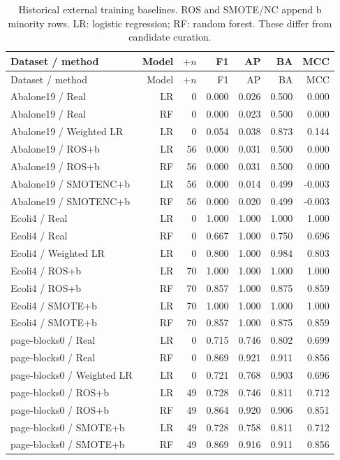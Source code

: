 \begin{longtable}{lrrrrrr}
\caption{Historical external training baselines. ROS and SMOTE/NC append b minority rows. LR: logistic regression; RF: random forest. These differ from candidate curation.}\label{tab:external}\\
\toprule
Dataset / method & Model & $+n$ & F1 & AP & BA & MCC \\
\midrule\endfirsthead
\toprule
Dataset / method & Model & $+n$ & F1 & AP & BA & MCC \\
\midrule\endhead
Abalone19 / Real & LR & 0 & 0.000 & 0.026 & 0.500 & 0.000 \\
Abalone19 / Real & RF & 0 & 0.000 & 0.023 & 0.500 & 0.000 \\
Abalone19 / Weighted LR & LR & 0 & 0.054 & 0.038 & 0.873 & 0.144 \\
Abalone19 / ROS+b & LR & 56 & 0.000 & 0.031 & 0.500 & 0.000 \\
Abalone19 / ROS+b & RF & 56 & 0.000 & 0.031 & 0.500 & 0.000 \\
Abalone19 / SMOTENC+b & LR & 56 & 0.000 & 0.014 & 0.499 & -0.003 \\
Abalone19 / SMOTENC+b & RF & 56 & 0.000 & 0.020 & 0.499 & -0.003 \\
Ecoli4 / Real & LR & 0 & 1.000 & 1.000 & 1.000 & 1.000 \\
Ecoli4 / Real & RF & 0 & 0.667 & 1.000 & 0.750 & 0.696 \\
Ecoli4 / Weighted LR & LR & 0 & 0.800 & 1.000 & 0.984 & 0.803 \\
Ecoli4 / ROS+b & LR & 70 & 1.000 & 1.000 & 1.000 & 1.000 \\
Ecoli4 / ROS+b & RF & 70 & 0.857 & 1.000 & 0.875 & 0.859 \\
Ecoli4 / SMOTE+b & LR & 70 & 1.000 & 1.000 & 1.000 & 1.000 \\
Ecoli4 / SMOTE+b & RF & 70 & 0.857 & 1.000 & 0.875 & 0.859 \\
page-blocks0 / Real & LR & 0 & 0.715 & 0.746 & 0.802 & 0.699 \\
page-blocks0 / Real & RF & 0 & 0.869 & 0.921 & 0.911 & 0.856 \\
page-blocks0 / Weighted LR & LR & 0 & 0.721 & 0.768 & 0.903 & 0.696 \\
page-blocks0 / ROS+b & LR & 49 & 0.728 & 0.746 & 0.811 & 0.712 \\
page-blocks0 / ROS+b & RF & 49 & 0.864 & 0.920 & 0.906 & 0.851 \\
page-blocks0 / SMOTE+b & LR & 49 & 0.728 & 0.758 & 0.811 & 0.712 \\
page-blocks0 / SMOTE+b & RF & 49 & 0.869 & 0.916 & 0.911 & 0.856 \\
\bottomrule\end{longtable}
